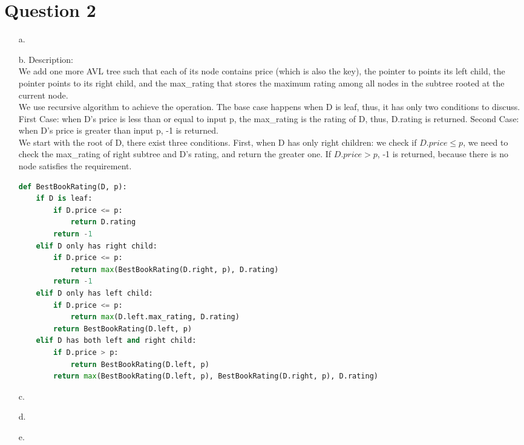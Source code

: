 \documentclass[10pt]{article}
\begin{document}
\section*{Question 2}
\begin{enumerate}
\item[a.]
\item[b.]
Description:\\
We add one more AVL tree such that each of its node contains price (which is also the key), the pointer to points its left child, the pointer points to its right child, and the max\_rating that stores the maximum rating among all nodes in the subtree rooted at the current node.\\
We use recursive algorithm to achieve the operation. The base case happens when D is leaf, thus, it has only two conditions to discuss. First Case: when D's price is less than or equal to input p, the max\_rating is the rating of D, thus, D.rating is returned. Second Case: when D's price is greater than input p, -1 is returned.\\
We start with the root of D, there exist three conditions. First, when D has only right children: we check if $D.price \leq p$, we need to check the max\_rating of right subtree and D's rating, and return the greater one. If $D.price > p$, -1 is returned, because there is no node satisfies the requirement.
\begin{lstlisting}[language=Python]
def BestBookRating(D, p):
	if D is leaf:
		if D.price <= p:
			return D.rating
		return -1
	elif D only has right child:
		if D.price <= p:
			return max(BestBookRating(D.right, p), D.rating)
		return -1
	elif D only has left child:
		if D.price <= p:
			return max(D.left.max_rating, D.rating)
		return BestBookRating(D.left, p)
	elif D has both left and right child:
		if D.price > p:
			return BestBookRating(D.left, p)
		return max(BestBookRating(D.left, p), BestBookRating(D.right, p), D.rating)
\end{lstlisting}

\item[c.]
\item[d.]
\item[e.]

\end{enumerate}
\end{document}
